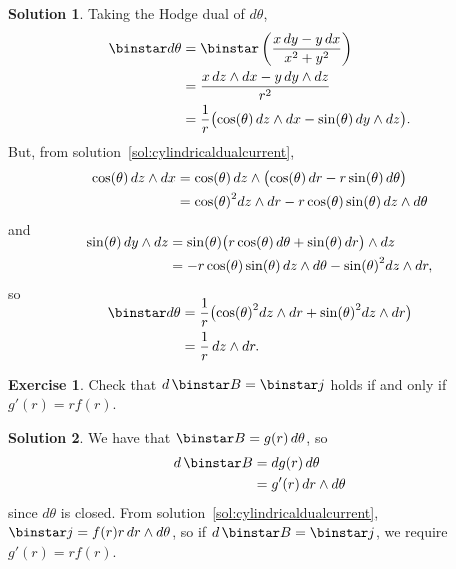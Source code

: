 \documentclass[11pt, a4paper]{report}
\theoremstyle{definition}
\newtheorem{exercise}{Exercise}[part]
\newtheorem{solution}{Solution}[part]
\newenvironment{ex}{\begin{exercise}}{\end{exercise}\pagebreak[1]}
\newenvironment{sol}{\begin{solution}}{\end{solution}\pagebreak[3]}
\renewcommand*{\d}{\ensuremath\mathop{}\mathopen{}d}
\renewcommand*{\star}{\ensuremath\mathop{}\mathopen\binstar\mathord{}}
\begin{document}
\begin{sol}

Taking the Hodge dual of $d\theta$,
\begin{align*}
    \star d\theta &= \star \left( \frac{x \d y - y \d x}{x^2 + y^2} \right) \\
                  &= \frac{x \d z \wedge dx - y \d y \wedge dz}{r^2} \\
                  &= \frac{1}{r} \bigl( \cos(\theta) \d z \wedge dx - \sin(\theta) \d y \wedge dz \bigr).
\end{align*}
But, from solution~\ref{sol:cylindricaldualcurrent},
\begin{align*}
    \cos(\theta) \d z \wedge dx &= \cos(\theta) \d z \wedge \bigl( \cos(\theta) \d r -r \sin(\theta) \d \theta \bigr) \\
        &= {\cos(\theta)}^2 dz \wedge dr - r \cos(\theta) \sin(\theta) \d z \wedge d\theta
\end{align*}
and
\begin{align*}
    \SwapAboveDisplaySkip
    \sin(\theta) \d y \wedge dz &= \sin(\theta) \bigl( r \cos(\theta) \d \theta + \sin(\theta) \d r \bigr) \wedge dz \\
        &= - r \cos(\theta) \sin(\theta) \d z \wedge d\theta - {\sin(\theta)}^2 dz \wedge dr,
\end{align*}
so
\begin{align*}
    \SwapAboveDisplaySkip
    \star d\theta &= \frac{1}{r} \bigl( {\cos(\theta)}^2 dz \wedge dr + {\sin(\theta)}^2 dz \wedge dr \bigr) \\
                  &= \frac{1}{r} \d z \wedge dr.
\end{align*}

\end{sol}

\begin{ex}

Check that $d \star B = \star j$ holds if and only if $g'(r) = r f(r)$.

\end{ex}

\begin{sol}

We have that $\star B = g(r) \d \theta$, so
\begin{align*}
    d \star B &= dg(r) \d \theta \\
              &= g'(r) \d r \wedge d\theta
\end{align*}
since $d\theta$ is closed.
From solution~\ref{sol:cylindricaldualcurrent}, $\star j = f(r) r \d r \wedge d\theta$, so if $d \star B = \star j$, we require $g'(r) = rf(r)$.

\end{sol}
\end{document}
